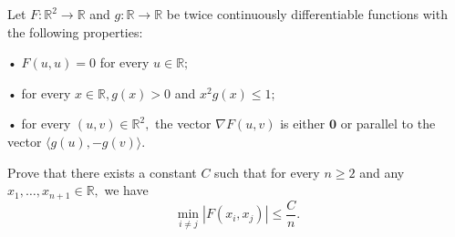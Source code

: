 Let $F:\mathbb{R}^2\to\mathbb{R}$ and $g:\mathbb{R}\to\mathbb{R}$ be twice continuously differentiable functions with the following properties:

• $F(u,u)=0$ for every $u\in\mathbb{R};$

• for every $x\in\mathbb{R},g(x)>0$ and $x^2g(x)\le 1;$

• for every $(u,v)\in\mathbb{R}^2,$ the vector $\nabla F(u,v)$ is either $\mathbf{0}$ or parallel to the vector $\langle g(u),-g(v)\rangle.$

Prove that there exists a constant $C$ such that for every $n\ge 2$ and any $x_1,\dots,x_{n+1}\in\mathbb{R},$ we have
\[\min_{i\ne j}|F(x_i,x_j)|\le\frac{C}{n}.\]